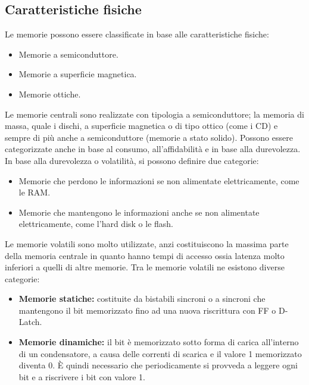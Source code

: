 \documentclass{article}
\begin{document}
\subsection{Caratteristiche fisiche}
Le memorie possono essere classificate in base alle caratteristiche fisiche:
\begin{itemize}
    \item Memorie a semiconduttore.
    \item Memorie a superficie magnetica.
    \item Memorie ottiche.
\end{itemize}
Le memorie centrali sono realizzate con tipologia a semiconduttore; la memoria di massa, quale i dischi, a superficie magnetica o di tipo ottico (come i CD) e sempre di più anche a semiconduttore (memorie a stato solido). 
Possono essere categorizzate anche in base al consumo, all'affidabilità e in base alla durevolezza. In base alla durevolezza o volatilità, si possono definire due categorie:
\begin{itemize}
    \item Memorie che perdono le informazioni se non alimentate elettricamente, come le RAM.
    \item Memorie che mantengono le informazioni anche se non alimentate elettricamente, come l’hard disk o le flash.
\end{itemize}
Le memorie volatili sono molto utilizzate, anzi costituiscono la massima parte della memoria centrale in quanto hanno tempi di accesso ossia latenza molto inferiori a quelli di altre memorie. Tra le memorie volatili ne esistono diverse categorie:
\begin{itemize}
    \item \textbf{Memorie statiche:} costituite da bistabili sincroni o a sincroni che mantengono il bit memorizzato fino ad una nuova riscrittura con FF o D-Latch.
    \item \textbf{Memorie dinamiche:} il bit è memorizzato sotto forma di carica all’interno di un condensatore, a causa delle correnti di scarica e il valore 1 memorizzato diventa 0. È quindi necessario che periodicamente si provveda a leggere ogni bit e a riscrivere i bit con valore 1.
\end{itemize}
\end{document}
